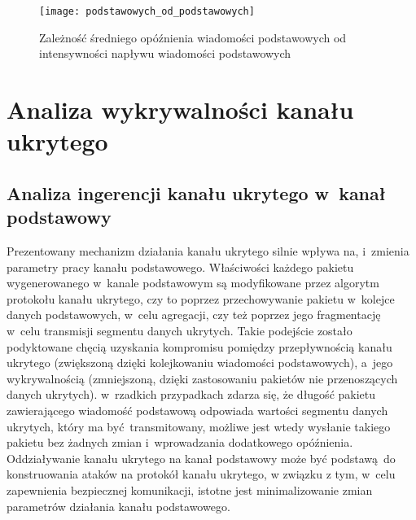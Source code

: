 \documentclass[a4paper, twoside, 12pt]{report}
\begin{document}
        \begin{figure}[h]
                \centering
                \texttt{[image: podstawowych\_od\_podstawowych]}
                \caption{Zależność średniego opóźnienia wiadomości podstawowych od
                    intensywności napływu wiadomości podstawowych}
                \label{OPOZNIENIEPODSTAWOWYCHODPODSTAWOWYCH}
        \end{figure}

\chapter{Analiza wykrywalności kanału ukrytego}
    \section{Analiza ingerencji kanału ukrytego w~kanał podstawowy}
        Prezentowany mechanizm działania kanału ukrytego silnie wpływa na, i~zmienia
        parametry pracy kanału podstawowego. Właściwości każdego pakietu wygenerowanego
        w~kanale podstawowym są modyfikowane przez algorytm protokołu kanału ukrytego,
        czy to poprzez przechowywanie pakietu w~kolejce danych podstawowych, w~celu
        agregacji, czy też
        poprzez jego fragmentację w~celu transmisji segmentu danych ukrytych. Takie podejście
        zostało podyktowane chęcią uzyskania kompromisu pomiędzy przepływnością
        kanału ukrytego (zwiększoną dzięki kolejkowaniu wiadomości podstawowych),
        a~jego wykrywalnością (zmniejszoną, dzięki zastosowaniu pakietów nie przenoszących danych ukrytych).
        w~rzadkich
        przypadkach zdarza się, że długość pakietu zawierającego wiadomość podstawową
        odpowiada wartości segmentu danych ukrytych, który ma być transmitowany,
        możliwe jest wtedy wysłanie takiego pakietu bez żadnych zmian i~wprowadzania
        dodatkowego opóźnienia. Oddziaływanie kanału ukrytego na kanał podstawowy
        może być podstawą do konstruowania ataków na protokół kanału ukrytego, w
        związku z tym, w~celu zapewnienia bezpiecznej komunikacji, istotne jest
        minimalizowanie zmian parametrów działania kanału podstawowego.
\end{document}
